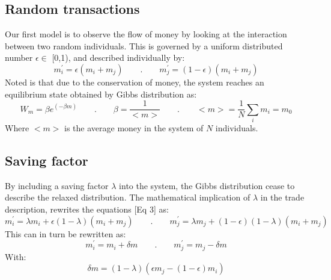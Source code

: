 \documentclass[a4paper,11pt]{article}
\begin{document}
	\subsection{Random transactions}
Our first model is to observe the flow of money by looking at the interaction between two random individuals. This is governed by a uniform distributed number $\epsilon \in$ [0,1), and described individually by:
\begin{equation}
	m^\prime_i = \epsilon(m_i+m_j) \qquad . \qquad m^\prime_j = (1-\epsilon)(m_i+m_j)
\end{equation}
Noted is that due to the conservation of money, the system reaches an equilibrium state obtained by Gibbs distribution as:
\begin{equation}
	W_m = \beta e^{(-\beta m)} \qquad . \qquad \beta = \frac{1}{<m>} \qquad . \qquad <m> = \frac{1}{N}\sum_i m_i =m_0
\end{equation}
Where $<m>$ is the average money in the system of $N$ individuals.
	\subsection{Saving factor}
By including a saving factor $\lambda$ into the system, the Gibbs distribution cease to describe the relaxed distribution. The mathematical implication of $\lambda$ in the trade description, rewrites the equations [Eq 3] as:
\begin{equation}
	m^\prime_i = \lambda m_i+\epsilon(1-\lambda)(m_i+m_j) \qquad . \qquad m^\prime_j = \lambda m_j+(1-\epsilon)(1-\lambda)(m_i+m_j)
\end{equation}
This can in turn be rewritten as:
\begin{equation}
	m^\prime_i = m_i+\delta m \qquad . \qquad m^\prime_j = m_j-\delta m
\end{equation}
With:
\begin{equation}
\delta m = (1-\lambda)(\epsilon m_j-(1-\epsilon)m_i)
\end{equation}
\end{document}
